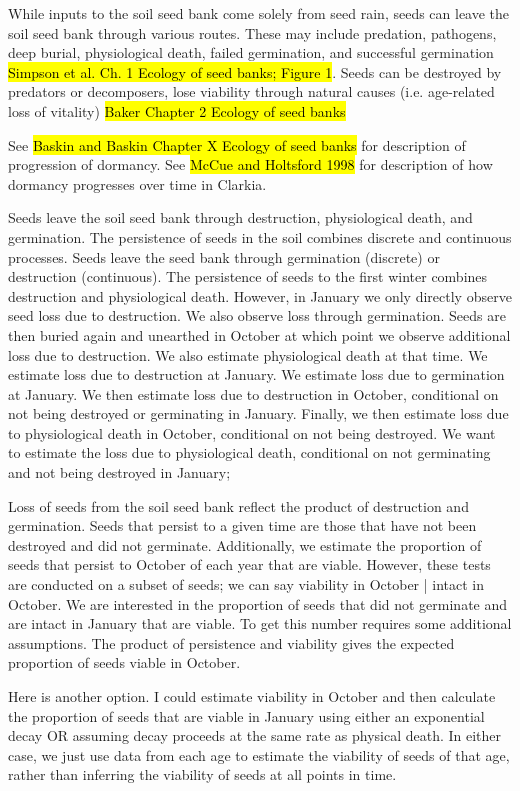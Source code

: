 \documentclass[12pt, oneside, titlepage]{article}   	%
\begin{document}
While inputs to the soil seed bank come solely from seed rain, seeds can leave the soil seed bank through various routes. These may include predation, pathogens, deep burial, physiological death, failed germination, and successful germination \hl{Simpson et al. Ch. 1 Ecology of seed banks; Figure 1}. Seeds can be destroyed by predators or decomposers, lose viability through natural causes (i.e. age-related loss of vitality) \hl{Baker Chapter 2 Ecology of seed banks}

See \hl{Baskin and Baskin Chapter X Ecology of seed banks} for description of progression of dormancy. See \hl{McCue and Holtsford 1998} for description of how dormancy progresses over time in Clarkia.

Seeds leave the soil seed bank through destruction, physiological death, and germination. The persistence of seeds in the soil combines discrete and continuous processes. Seeds leave the seed bank through germination (discrete) or destruction (continuous). The persistence of seeds to the first winter combines destruction and physiological death. However, in January we only directly observe seed loss due to destruction. We also observe loss through germination. Seeds are then buried again and unearthed in October at which point we observe additional loss due to destruction. We also estimate physiological death at that time. We estimate loss due to destruction at January. We estimate loss due to germination at January. We then estimate loss due to destruction in October, conditional on not being destroyed or germinating in January. Finally, we then estimate loss due to physiological death in October, conditional on not being destroyed. We want to estimate the loss due to physiological death, conditional on not germinating and not being destroyed in January;

Loss of seeds from the soil seed bank reflect the product of destruction and germination. Seeds that persist to a given time are those that have not been destroyed and did not germinate. Additionally, we estimate the proportion of seeds that persist to October of each year that are viable. However, these tests are conducted on a subset of seeds; we can say viability in October | intact in October. We are interested in the proportion of seeds that did not germinate and are intact in January that are viable. To get this number requires some additional assumptions. The product of persistence and viability gives the expected proportion of seeds viable in October. 

Here is another option. I could estimate viability in October and then calculate the proportion of seeds that are viable in January using either an exponential decay OR assuming decay proceeds at the same rate as physical death. In either case, we just use data from each age to estimate the viability of seeds of that age, rather than inferring the viability of seeds at all points in time. 
\end{document}
